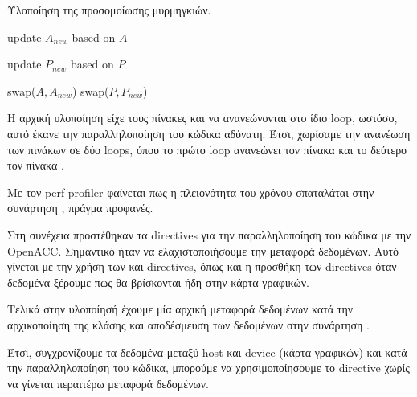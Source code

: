 \documentclass[11pt]{scrartcl} %
\begin{document}
\begin{algorithm}[H]
\caption{Υλοποίηση της προσομοίωσης μυρμηγκιών.}
\label{alg:serial}
\begin{algorithmic}[1]
    \State update $A_{new}$ based on $A$
\EndFor
\EndFor

    \State update $P_{new}$ based on $P$
\EndFor
\EndFor

    \State swap($A, A_{new}$)
    \State swap($P, P_{new}$)
\EndProcedure
\end{algorithmic}
\end{algorithm}

Η αρχική υλοποίηση είχε τους πίνακες  και  να ανανεώνονται στο ίδιο loop,
ωστόσο, αυτό έκανε την παραλληλοποίηση του κώδικα αδύνατη. Έτσι, 
χωρίσαμε την ανανέωση των πινάκων σε δύο loops, όπου το πρώτο loop ανανεώνει τον πίνακα  και το δεύτερο τον πίνακα .

Με τον perf profiler φαίνεται πως η πλειονότητα του χρόνου σπαταλάται στην συνάρτηση ,
πράγμα προφανές.



Στη συνέχεια προστέθηκαν τα directives για την παραλληλοποίηση του κώδικα με την OpenACC.
Σημαντικό ήταν να ελαχιστοποιήσουμε την μεταφορά δεδομένων. Αυτό γίνεται με την χρήση των  και  directives,
όπως και η προσθήκη των  directives όταν δεδομένα ξέρουμε πως θα βρίσκονται ήδη στην κάρτα γραφικών.

Τελικά στην υλοποίησή έχουμε μία αρχική μεταφορά δεδομένων 
κατά την αρχικοποίηση της κλάσης  και αποδέσμευση των δεδομένων στην συνάρτηση .





Έτσι, συγχρονίζουμε τα δεδομένα μεταξύ host και device (κάρτα γραφικών) και κατά την παραλληλοποίηση του κώδικα, 
μπορούμε να χρησιμοποίησουμε το  directive χωρίς να γίνεται περαιτέρω μεταφορά δεδομένων.
\end{document}
